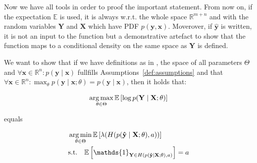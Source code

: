 Now we have all tools in order to proof the important statement. From now on, if the expectation $\mathbb{E}$ is used, it is always w.r.t. the whole space $\mathbb{R}^{m+n}$ and with the random variables $\mathbf{Y}$ and $\mathbf{X}$ which have PDF $p(\mathbf{y}, \mathbf{x})$. Moverover, if $\mathbf{\hat{y}}$ is written, it is not an input to the function but a demonstrative artefact to show that the function maps to a conditional density on the same space as $\mathbf{Y}$ is defined.

\begin{theorem}\label{thm:optimal_cp}
    We want to show that if we have definitions as in , the space of all parameters $\Theta$ and $\forall \mathbf{x}\in\mathbb{R}^n: p(\mathbf{y}\mid \mathbf{x})$ fullfills Assumptions~\ref{def:assumptions} and that $\forall \mathbf{x}\in \mathbb{R}^n: \max_{\theta} p(\mathbf{y} \mid \mathbf{x}; \theta) = p(\mathbf{y} \mid \mathbf{x})$, then it holds that:

    \begin{equation}
        \operatorname*{arg\,max}_{\theta \in \Theta}  \mathbb{E} \left[ \log
            p(\mathbf{Y} \mid \mathbf{X}; \theta) \right]
    \end{equation}

    equals

    \begin{align}
         & \argmin_{\theta \in \Theta} \mathbb{E} \left[
            \lambda(H(p(\mathbf{\hat{y}} \mid \mathbf{X}; \theta), a))
        \right]                                          \\
         & \text{s.t.} \quad \mathbb{E} \left[
        \mathds{1}_{\mathbf{Y} \in
        H(p(\mathbf{\hat{y}} \mid \mathbf{X}; \theta), a)} \right]
        = a
    \end{align}

\end{theorem}

